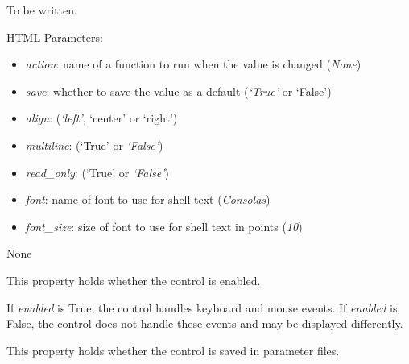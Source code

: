 \documentclass[letterpaper,10pt,english]{sphinxmanual}
\begin{document}
\begin{fulllineitems}
\label{api:controls.TextBox}
To be written.

HTML Parameters:
\begin{itemize}
\item {} 
\emph{action}: name of a function to run when the value is changed (\emph{None})

\item {} 
\emph{save}: whether to save the value as a default (\emph{`True'} or `False')

\item {} 
\emph{align}: (\emph{`left'}, `center' or `right')

\item {} 
\emph{multiline}: (`True' or \emph{`False'})

\item {} 
\emph{read\_only}: (`True' or \emph{`False'})

\item {} 
\emph{font}: name of font to use for shell text (\emph{Consolas})

\item {} 
\emph{font\_size}: size of font to use for shell text in points (\emph{10})

\end{itemize}

\begin{fulllineitems}
\label{api:controls.TextBox.action}
None

\end{fulllineitems}


\begin{fulllineitems}
\label{api:controls.TextBox.enabled}
This property holds whether the control is enabled.

If \emph{enabled} is True, the control handles keyboard and mouse events.
If \emph{enabled} is False, the control does not handle these events and may
be displayed differently.

\end{fulllineitems}


\begin{fulllineitems}
\label{api:controls.TextBox.save}
This property holds whether the control is saved in parameter files.


\end{fulllineitems}
\end{fulllineitems}
\end{document}
